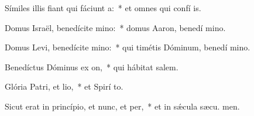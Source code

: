 \item Símiles illis fiant qui fáciunt a:~* et omnes qui confí  is.
\item Domus Israël, benedícite mino:~* domus Aaron, benedí mino.
\item Domus Levi, benedícite mino:~* qui timétis Dóminum, benedí mino.
\item Benedíctus Dóminus ex on,~* qui hábitat  salem.
\item Glória Patri, et lio,~* et Spirí to.
\item Sicut erat in princípio, et nunc, et per,~* et in sǽcula sæcu. men.
